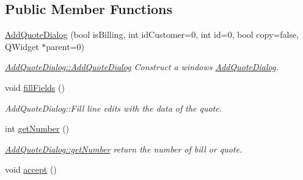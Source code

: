 \subsection*{Public Member Functions}
\begin{DoxyCompactItemize}
\item 
\hyperlink{classGui_1_1Dialogs_1_1AddQuoteDialog_acd7cc49da87e4bbe0317dc1e5f3d58cb}{Add\-Quote\-Dialog} (bool is\-Billing, int id\-Customer=0, int id=0, bool copy=false, Q\-Widget $\ast$parent=0)
\begin{DoxyCompactList}\small\item\em \hyperlink{classGui_1_1Dialogs_1_1AddQuoteDialog_acd7cc49da87e4bbe0317dc1e5f3d58cb}{Add\-Quote\-Dialog\-::\-Add\-Quote\-Dialog} Construct a windows \hyperlink{classGui_1_1Dialogs_1_1AddQuoteDialog}{Add\-Quote\-Dialog}. \end{DoxyCompactList}\item 
\hypertarget{classGui_1_1Dialogs_1_1AddQuoteDialog_a5dd0cca14b1172a7e1dd9019d8fa8ff3}{void \hyperlink{classGui_1_1Dialogs_1_1AddQuoteDialog_a5dd0cca14b1172a7e1dd9019d8fa8ff3}{fill\-Fields} ()}\label{classGui_1_1Dialogs_1_1AddQuoteDialog_a5dd0cca14b1172a7e1dd9019d8fa8ff3}

\begin{DoxyCompactList}\small\item\em Add\-Quote\-Dialog\-::\-Fill line edits with the data of the quote. \end{DoxyCompactList}\item 
int \hyperlink{classGui_1_1Dialogs_1_1AddQuoteDialog_a68b6b01e0818cb6615b2335d486aac09}{get\-Number} ()
\begin{DoxyCompactList}\small\item\em \hyperlink{classGui_1_1Dialogs_1_1AddQuoteDialog_a68b6b01e0818cb6615b2335d486aac09}{Add\-Quote\-Dialog\-::get\-Number} return the number of bill or quote. \end{DoxyCompactList}\item 
\hypertarget{classGui_1_1Dialogs_1_1AddQuoteDialog_abcc6fc79a513dd1765a4494d9499586b}{void \hyperlink{classGui_1_1Dialogs_1_1AddQuoteDialog_abcc6fc79a513dd1765a4494d9499586b}{accept} ()}\label{classGui_1_1Dialogs_1_1AddQuoteDialog_abcc6fc79a513dd1765a4494d9499586b}


\end{DoxyCompactItemize}
